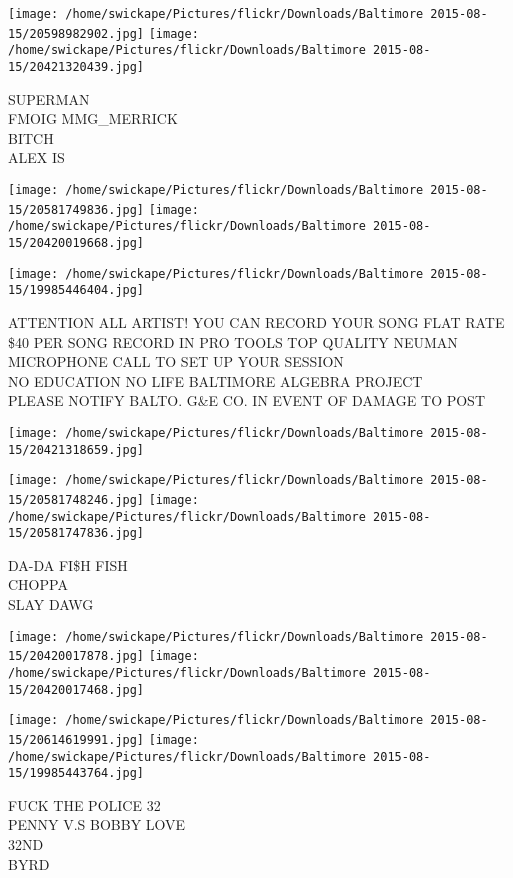 \documentclass[10pt,letterpaper]{article}
\begin{document}
\texttt{[image: /home/swickape/Pictures/flickr/Downloads/Baltimore 2015-08-15/20598982902.jpg]}
\texttt{[image: /home/swickape/Pictures/flickr/Downloads/Baltimore 2015-08-15/20421320439.jpg]}

SUPERMAN\\
FMOIG MMG\_MERRICK\\
BITCH\\
ALEX IS\\
\pagebreak

\texttt{[image: /home/swickape/Pictures/flickr/Downloads/Baltimore 2015-08-15/20581749836.jpg]}
\texttt{[image: /home/swickape/Pictures/flickr/Downloads/Baltimore 2015-08-15/20420019668.jpg]}

\texttt{[image: /home/swickape/Pictures/flickr/Downloads/Baltimore 2015-08-15/19985446404.jpg]}

ATTENTION ALL ARTIST!  YOU CAN RECORD YOUR SONG FLAT RATE \$40 PER SONG RECORD IN PRO TOOLS TOP QUALITY NEUMAN MICROPHONE CALL TO SET UP YOUR SESSION\\
NO EDUCATION NO LIFE BALTIMORE ALGEBRA PROJECT\\
PLEASE NOTIFY BALTO. G\&E CO. IN EVENT OF DAMAGE TO POST\\
\pagebreak

\texttt{[image: /home/swickape/Pictures/flickr/Downloads/Baltimore 2015-08-15/20421318659.jpg]}

\vspace{0.25in}
\texttt{[image: /home/swickape/Pictures/flickr/Downloads/Baltimore 2015-08-15/20581748246.jpg]}
\texttt{[image: /home/swickape/Pictures/flickr/Downloads/Baltimore 2015-08-15/20581747836.jpg]}

DA{-}DA FI\$H FISH\\
CHOPPA\\
SLAY DAWG\\
\pagebreak

\texttt{[image: /home/swickape/Pictures/flickr/Downloads/Baltimore 2015-08-15/20420017878.jpg]}
\texttt{[image: /home/swickape/Pictures/flickr/Downloads/Baltimore 2015-08-15/20420017468.jpg]}

\texttt{[image: /home/swickape/Pictures/flickr/Downloads/Baltimore 2015-08-15/20614619991.jpg]}
\texttt{[image: /home/swickape/Pictures/flickr/Downloads/Baltimore 2015-08-15/19985443764.jpg]}

FUCK THE POLICE 32\\
PENNY V.S BOBBY LOVE\\
32ND\\
BYRD\\
\pagebreak
\end{document}
